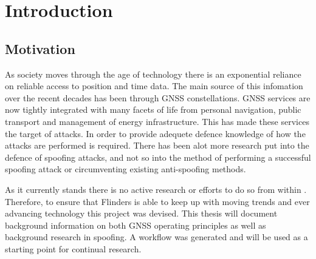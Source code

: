 
\chapter{Introduction}\label{chapter:firstchapter} %

\label{Chapter1} %

\section{Motivation}\label{sec:Motivation}


As society moves through the age of technology there is an exponential reliance on reliable access to position and time data. The main source of this infomation over the
recent decades has been through GNSS constellations. GNSS services are now tightly integrated with many facets of life from personal navigation, public transport and
management of energy infrastructure. This has made these services the target of attacks. In order to provide adequete defence knowledge of how the attacks are performed is
required. There has been alot more research put into the defence of spoofing attacks, and not so into the method of performing a successful spoofing attack or
circumventing existing anti-spoofing methods. 

As it currently stands there is no active research or efforts to do so from within \univname. Therefore, to ensure that Flinders is able to keep up with moving trends and
ever advancing technology this project was devised. This thesis will document background information on both GNSS operating principles as well as background research in
spoofing. A workflow was generated and will be used as a starting point for continual research.

